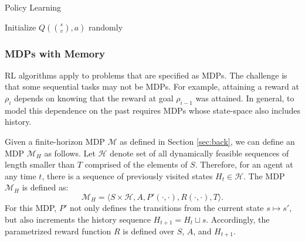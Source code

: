 \begin{phase}[t]
\small
\DontPrintSemicolon
\caption{Policy Learning \label{alg:tsh3}}

Initialize $Q(\binom{s}{v},a)$ randomly


\end{phase}

\vspace{-15pt}
\subsubsection{MDPs with Memory}
RL algorithms apply to problems that are specified as MDPs.
The challenge is that some sequential tasks may not be MDPs.
For example, attaining a reward at $\rho_i$ depends on knowing that the reward at goal $\rho_{i-1}$ was attained.
In general, to model this dependence on the past requires MDPs whose state-space also includes history.

Given a finite-horizon MDP $\mathcal{M}$ as defined in Section \ref{sec:back}, we can define an MDP $\mathcal{M}_H$ as follows.
Let $\mathcal{H}$ denote set of all dynamically feasible sequences of length smaller than $T$ comprised of the elements of $S$.
Therefore, for an agent at any time $t$, there is a sequence of previously visited states $H_t \in \mathcal{H}$.
The MDP $\mathcal{M}_H$ is defined as:
\[
\mathcal{M}_H = \langle S \times \mathcal{H},A,P'(\cdot,\cdot), R(\cdot,\cdot),T \rangle.
\]
For this MDP, $P'$ not only defines the transitions from the current state $s \mapsto s'$, but also increments the history sequence $H_{t+1} = H_{t} \sqcup s$.
Accordingly, the parametrized reward function $R$ is defined over $S$, $A$, and $H_{t+1}$.

